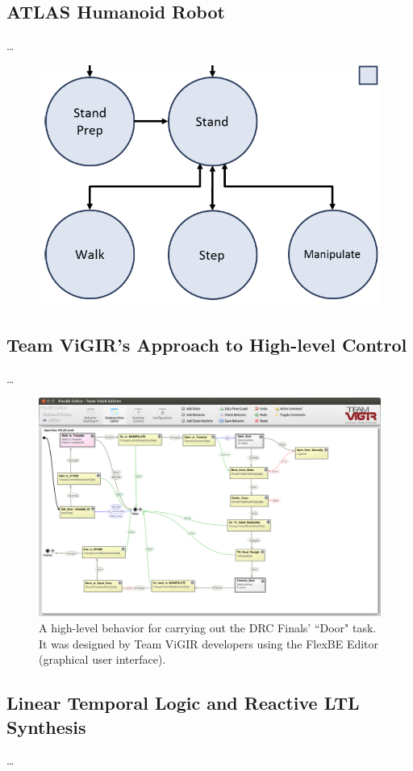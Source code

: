 
\subsection{ATLAS Humanoid Robot}

\ldots

\begin{figure}[t]
\centering
\includegraphics[width=0.99\columnwidth,clip]{./img/control_modes_ts.png}
\caption{
}
\label{Fig:ControlModeTS}
\end{figure}

\subsection{Team ViGIR's Approach to High-level Control}

\ldots

\begin{figure}[t]
\centering
\includegraphics[width=0.99\columnwidth,clip]{./img/behavior_open_door.png}
\caption{A high-level behavior for carrying out the DRC Finals' ``Door" task.
It was designed by Team ViGIR developers using the FlexBE Editor (graphical user interface).
}
\label{Fig:FlexBESM}
\end{figure}

\subsection{Linear Temporal Logic and Reactive LTL Synthesis}

\ldots